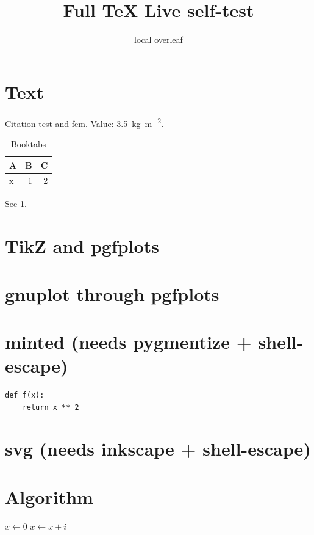 \documentclass[11pt]{article}
\title{Full TeX Live self-test}
\author{local overleaf}
\begin{document}
\maketitle
\section{Text}
Citation test \cite{knuth1984} and \gls{fem}. Value: \SI{3.5}{\kilo\gram\per\square\metre}.
\begin{table}[h]\centering
\begin{tabular}{lrr}\toprule A & B & C \\ \midrule x & 1 & 2 \\ \bottomrule\end{tabular}
\caption{Booktabs}\label{tab:t}\end{table}
See \cref{tab:t}.
\section{TikZ and pgfplots}
\section{gnuplot through pgfplots}
\section{minted (needs pygmentize + shell-escape)}
\begin{verbatim}
def f(x):
    return x ** 2
\end{verbatim}
\section{svg (needs inkscape + shell-escape)}

\section{Algorithm}
\begin{algorithmic}[1]\State $x \gets 0$ \State $x \gets x+i$\EndFor\end{algorithmic}
\printglossary[type=\acronymtype]
\printbibliography
\end{document}
